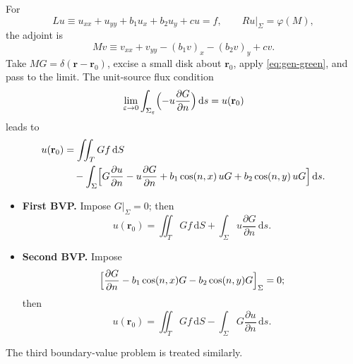 For
\begin{equation}
Lu\equiv u_{xx}+u_{yy}+b_1 u_x+b_2 u_y+cu=f,
\qquad
Ru\big|_{\Sigma}=\varphi(M),
\end{equation}
the adjoint is
\begin{equation}
Mv\equiv v_{xx}+v_{yy}-(b_1 v)_x-(b_2 v)_y+cv.
\end{equation}
Take $MG=\delta(\mathbf{r}-\mathbf{r}_0)$, excise a small disk about $\mathbf{r}_0$, apply \eqref{eq:gen-green}, and pass to the limit. The unit-source flux condition
\begin{equation}
\lim_{\varepsilon\to0}\int_{\Sigma_\varepsilon}\Bigl(-u\frac{\partial G}{\partial n}\Bigr)\,\mathrm{d}s=u(\mathbf{r}_0)
\end{equation}
leads to
\begin{equation}
\label{eq:elliptic-rep}
\begin{aligned}
u(\mathbf{r}_0)
&=\iint_{T}Gf\,\mathrm{d}S\\
&\quad-\int_{\Sigma}\Bigl[
G\frac{\partial u}{\partial n}-u\frac{\partial G}{\partial n}
+b_1\cos(n,x)\,uG+b_2\cos(n,y)\,uG
\Bigr]\,\mathrm{d}s.
\end{aligned}
\end{equation}
\begin{itemize}
\item \textbf{First BVP.} Impose $G|_{\Sigma}=0$; then
\begin{equation}
u(\mathbf{r}_0)=\iint_{T}Gf\,\mathrm{d}S+\int_{\Sigma}u\frac{\partial G}{\partial n}\,\mathrm{d}s.
\end{equation}
\item \textbf{Second BVP.} Impose
\begin{equation}
\Bigl[\frac{\partial G}{\partial n}-b_1\cos(n,x)G-b_2\cos(n,y)G\Bigr]_{\Sigma}=0;
\end{equation}
then
\begin{equation}
u(\mathbf{r}_0)=\iint_{T}Gf\,\mathrm{d}S-\int_{\Sigma}G\frac{\partial u}{\partial n}\,\mathrm{d}s.
\end{equation}
\end{itemize}
The third boundary-value problem is treated similarly.


